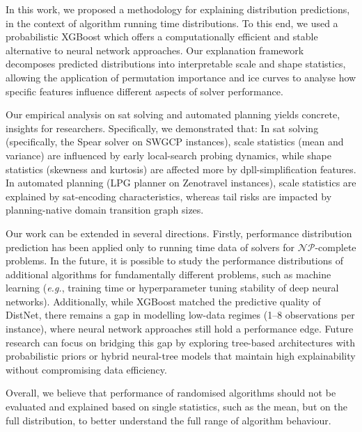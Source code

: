 {In this work, we proposed a methodology for explaining distribution predictions, in the context of algorithm running time distributions. To this end, we used a probabilistic XGBoost which offers a computationally efficient and stable alternative to neural network approaches. Our explanation framework decomposes predicted distributions into interpretable scale and shape statistics, allowing the application of permutation importance and \gls{ice} curves to analyse how specific features influence different aspects of solver performance.

Our empirical analysis on \gls{sat} solving and automated planning yields concrete, insights for researchers. Specifically, we demonstrated that:
In \gls{sat} solving (specifically, the Spear solver on SWGCP instances), scale statistics (mean and variance) are influenced by early local-search probing dynamics, while shape statistics (skewness and kurtosis) are affected more by \gls{dpll}-simplification features. 
In automated planning (LPG planner on Zenotravel instances), scale statistics are explained by \gls{sat}-encoding characteristics, whereas tail risks are impacted by planning-native domain transition graph sizes. 

Our work can be extended in several directions. Firstly, performance distribution prediction has been applied only to running time data of solvers for $\mathcal{NP}$-complete problems. In the future, it is possible to study the performance distributions of additional algorithms for fundamentally different problems, such as machine learning (\emph{e.g.}, training time or hyperparameter tuning stability of deep neural networks). Additionally, while XGBoost matched the predictive quality of DistNet, there remains a gap in modelling low-data regimes (1–8 observations per instance), where neural network approaches still hold a performance edge. Future research can focus on bridging this gap by exploring tree-based architectures with probabilistic priors or hybrid neural-tree models that maintain high explainability without compromising data efficiency.

Overall, we believe that performance of randomised algorithms should not be evaluated and explained based on single statistics, such as the mean, but on the full distribution, to better understand the full range of algorithm behaviour.}